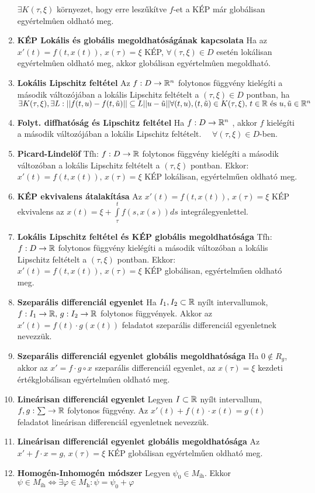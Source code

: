 \documentclass{article}
\begin{document}
\begin{enumerate}
	$\exists K(\tau,\xi)$ környezet, hogy erre leszűkítve $f$-et  a KÉP már globálisan egyértelmûen oldható meg.
	\item\textbf{KÉP Lokális és globális megoldhatóságának kapcsolata}\br
	Ha az $x'(t)=f(t, x(t))\text{,  }x(\tau)=\xi$ KÉP, $\forall(\tau,\xi)\in D$
	esetén lokálisan egyértelmûen oldható meg, akkor globálisan egyértelmûen megoldható.
	\item\textbf{Lokális Lipschitz feltétel}\br
	Az $f:D\rightarrow\mathbb{R}^n$ folytonos függvény kielégíti a második változójában a lokális Lipschitz
	feltételt a $(\tau,\xi)\in D$ pontban, ha $\exists K(\tau,\xi),\exists
	L:||f(t,u)-f(t,\tilde{u})||\subseteq L||u-\tilde{u}||\br\forall(t,u),(t,
	\tilde{u})\in K(\tau,\xi)\text{,  }t\in\R\text{  és  }u,\tilde{u}\in\R^n$
	\item\textbf{Folyt. diffhatóság és Lipschitz feltétel}\br
	Ha $f:D\rightarrow\mathbb{R}^n$ \folytdifh, akkor $f$ kielégíti a második változójában a lokális Lipschitz feltételt.
	$\quad\forall(\tau,\xi)\in D$-ben.
	\item\textbf{Picard-Lindelöf}\br
	Tfh: $f:D\rightarrow\mathbb{R}$ folytonos függvény kielégíti a második változóban a lokális Lipschitz feltételt a
	$(\tau,\xi)$ pontban. Ekkor: $x'(t)=f(t, x(t))\text{,  }x(\tau)=\xi$ KÉP lokálisan, egyértelműen oldható meg.
	\item\textbf{KÉP ekvivalens átalakítása}\br
	Az $x'(t)=f(t, x(t))\text{,  }x(\tau)=\xi$ KÉP ekvivalens az $x(t)=\xi+
	\int\limits_{\tau}^{t}f(s,x(s))ds$ integrálegyenlettel.
	\item\textbf{Lokális Lipschitz feltétel és KÉP globális megoldhatósága}\br
	Tfh: $f:D\rightarrow\mathbb{R}$ folytonos függvény kielégíti a második változóban a lokális Lipschitz feltételt a
	$(\tau,\xi)$ pontban. Ekkor: $x'(t)=f(t, x(t))\text{,  }x(\tau)=\xi$ KÉP globálisan, egyértelműen oldható meg.
	\item\textbf{Szeparális differenciál egyenlet}\br
	Ha $I_1,I_2\subset\mathbb{R}$ nyílt intervallumok, $f:I_1\rightarrow\mathbb{R}\text{,  }
	g:I_2\rightarrow\mathbb{R}$ folytonos függvények.\br
	Akkor az $x'(t)=f(t)\cdot g(x(t))$ feladatot szeparális differenciál egyenletnek nevezzük.
	\item\textbf{Szeparális differenciál egyenlet globális megoldhatósága}\br
	Ha $0\notin R_g$, akkor az $x'=f\cdot g \circ x$ szeparális differenciál egyenlet, az 
	$x(\tau)=\xi$ kezdeti érték\br globálisan egyértelmûen oldható meg.
	\item\textbf{Lineárisan differenciál egyenlet}\br
	Legyen $I\subset\mathbb{R}$ nyílt intervallum, $f,g:\sum\rightarrow\mathbb{R}$ folytonos függvény.
	Az $x'(t)+f(t)\cdot x(t)=g(t)$ feladatot lineárisan differenciál egyenletnek nevezzük.
	\item\textbf{Lineárisan differenciál egyenlet globális megoldhatósága}\br
	Az $x'+f\cdot x=g\text{,  }x(\tau)=\xi$ KÉP globálisan egyértelműen oldható meg.
	\item\textbf{Homogén-Inhomogén módszer}\br
	Legyen $\psi_0\in M_{\text{ih}}$. Ekkor $\psi\in M_{\text{ih}}\Leftrightarrow
	\exists\varphi\in M_{\text{h}}:\psi=\psi_0+\varphi$
\end{enumerate}
\end{document}
